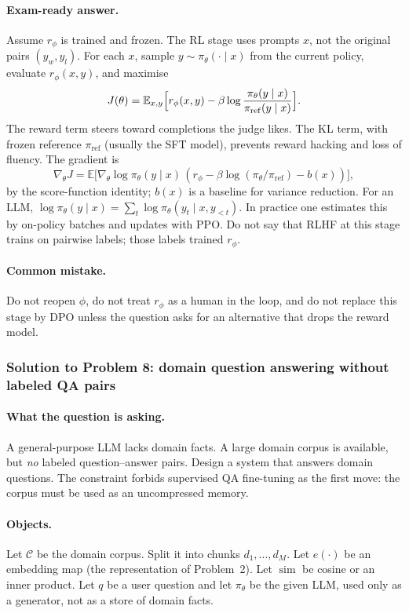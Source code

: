 \documentclass[11pt,a4paper]{article}
\theoremstyle{definition}
\begin{document}
\paragraph{Exam-ready answer.}
Assume \(r_\phi\) is trained and frozen. The RL stage uses prompts \(x\), not the original pairs \((y_w,y_l)\). For each \(x\), sample \(y\sim\pi_\theta(\cdot\mid x)\) from the current policy, evaluate \(r_\phi(x,y)\), and maximise
\[
J(\theta)
=\mathbb{E}_{x,y}\Bigl[r_\phi(x,y)-\beta\log\frac{\pi_\theta(y\mid x)}{\pi_{\mathrm{ref}}(y\mid x)}\Bigr].
\]
The reward term steers toward completions the judge likes. The KL term, with frozen reference \(\pi_{\mathrm{ref}}\) (usually the SFT model), prevents reward hacking and loss of fluency. The gradient is
\[
\nabla_\theta J
=\mathbb{E}\bigl[\nabla_\theta\log\pi_\theta(y\mid x)\,(r_\phi-\beta\log(\pi_\theta/\pi_{\mathrm{ref}})-b(x))\bigr],
\]
by the score-function identity; \(b(x)\) is a baseline for variance reduction. For an LLM, \(\log\pi_\theta(y\mid x)=\sum_t\log\pi_\theta(y_t\mid x,y_{<t})\). In practice one estimates this by on-policy batches and updates with PPO. Do not say that RLHF at this stage trains on pairwise labels; those labels trained \(r_\phi\).

\paragraph{Common mistake.}
Do not reopen \(\phi\), do not treat \(r_\phi\) as a human in the loop, and do not replace this stage by DPO unless the question asks for an alternative that drops the reward model.

\subsubsection{Solution to Problem 8: domain question answering without labeled QA pairs}

\paragraph{What the question is asking.}
A general-purpose LLM lacks domain facts. A large domain corpus is available, but \emph{no} labeled question--answer pairs. Design a system that answers domain questions. The constraint forbids supervised QA fine-tuning as the first move: the corpus must be used as an uncompressed memory.

\paragraph{Objects.}
Let \(\mathcal{C}\) be the domain corpus. Split it into chunks \(d_1,\ldots,d_M\). Let \(e(\cdot)\) be an embedding map (the representation of Problem~2). Let \(\operatorname{sim}\) be cosine or an inner product. Let \(q\) be a user question and let \(\pi_\theta\) be the given LLM, used only as a generator, not as a store of domain facts.
\end{document}
